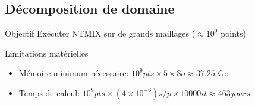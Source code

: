 \documentclass{beamer}
\begin{document}
\subsection{Décomposition de domaine}
\begin{frame}
  \begin{block}{Objectif}
    Exécuter NTMIX sur de grands maillages ($\approx 10^9$ points)
  \end{block}
  \pause
  \begin{alertblock}{Limitations matérielles}
    \begin{itemize}
    \item     Mémoire minimum nécessaire: $10^9pts \times 5 \times 8o \approx 37.25$ Go
    \item     Temps de calcul: $10^9 pts\times(4\times10^{-6})s/p\times10000it\approx463jours$
    \end{itemize}
  \end{alertblock}
  
\end{frame}
\end{document}
